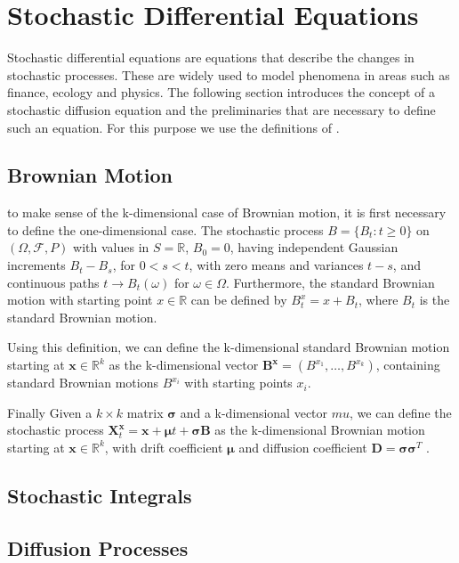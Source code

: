 \section{Stochastic Differential Equations}
Stochastic differential equations are equations that describe the changes in stochastic processes. These are widely used to model phenomena in areas such as finance, ecology and physics. The following section introduces the concept of a stochastic diffusion equation and the preliminaries that are necessary to define such an equation. For this purpose we use the definitions of \cite{bhattacharya_continuous_2023}.


\subsection{Brownian Motion}
to make sense of the k-dimensional case of Brownian motion, it is first necessary to define the one-dimensional case. The stochastic process $B = \{B_t:t\geq 0\}$ on $(\Omega, \mathcal{F}, P)$ with values in $S = \mathbb{R}$, $B_0 = 0$, having independent Gaussian increments $B_t - B_s$, for $0 < s < t$, with zero means  and variances $t-s$, and continuous paths $t \rightarrow B_t(\omega)$ for $\omega \in \Omega$. Furthermore, the standard Brownian motion with starting point $x \in \mathbb{R}$ can be defined by $B^x_t = x + B_t$, where $B_t$ is the standard Brownian motion.

Using this definition, we can define the k-dimensional standard Brownian motion starting at $\textbf{x} \in \mathbb{R}^k$ as the k-dimensional vector $\mathbf{B}^\mathbf{x} = (B^{x_1}, \dots , B^{x_k})$, containing standard Brownian motions $B^{x_i}$ with starting points $x_i$.

Finally Given a $k \times k$ matrix $\pmb{\sigma}$ and a k-dimensional vector $mu$, we can define the stochastic process $\mathbf{X}_t^\mathbf{x} = \mathbf{x} + \pmb{\mu}t + \pmb{\sigma} \mathbf{B}$ as the k-dimensional Brownian motion starting at $\mathbf{x} \in \mathbb{R}^k$, with drift coefficient $\pmb{\mu}$ and diffusion coefficient $\mathbf{D} = \pmb{\sigma} \pmb{\sigma}^T$ \cite{bhattacharya_continuous_2023}.

\subsection{Stochastic Integrals}


\subsection{Diffusion Processes}

